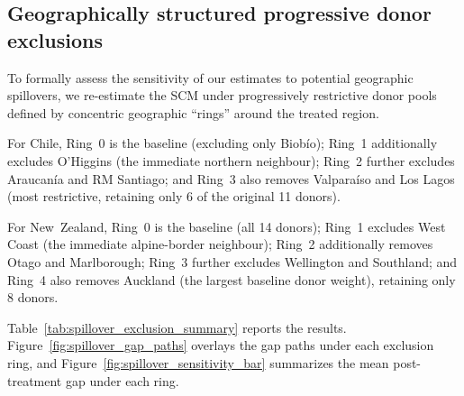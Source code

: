 \documentclass[12pt]{article}
\begin{document}
\subsection{Geographically structured progressive donor exclusions}
\label{subsec:progressive_exclusion}

To formally assess the sensitivity of our estimates to potential geographic spillovers, we re-estimate the SCM under progressively restrictive donor pools defined by concentric geographic ``rings'' around the treated region.

For Chile, Ring~0 is the baseline (excluding only Biobío); Ring~1 additionally excludes O'Higgins (the immediate northern neighbour); Ring~2 further excludes Araucanía and RM Santiago; and Ring~3 also removes Valparaíso and Los Lagos (most restrictive, retaining only 6 of the original 11 donors).

For New~Zealand, Ring~0 is the baseline (all 14 donors); Ring~1 excludes West Coast (the immediate alpine-border neighbour); Ring~2 additionally removes Otago and Marlborough; Ring~3 further excludes Wellington and Southland; and Ring~4 also removes Auckland (the largest baseline donor weight), retaining only 8 donors.

Table~\ref{tab:spillover_exclusion_summary} reports the results. Figure~\ref{fig:spillover_gap_paths} overlays the gap paths under each exclusion ring, and Figure~\ref{fig:spillover_sensitivity_bar} summarizes the mean post-treatment gap under each ring.\\
\end{document}
